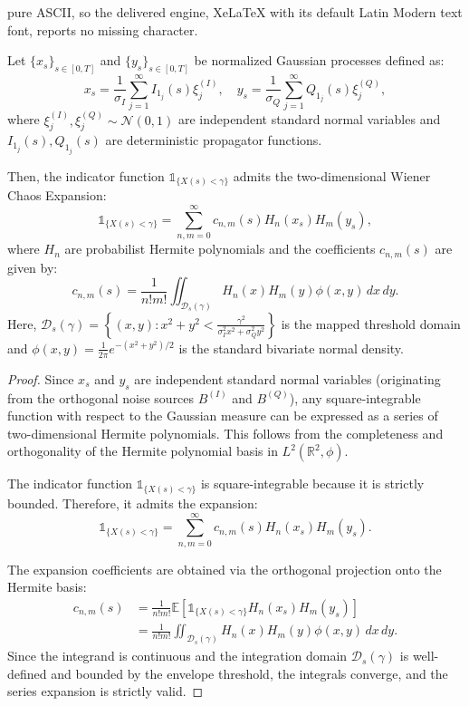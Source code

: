 \documentclass[10pt,a4paper]{amsart}
\begin{document}
pure ASCII, so the delivered engine, XeLaTeX with its default Latin Modern text font, reports no missing character.
\begin{proposition}\label{prop:ou_exact}
Let $\{x_s\}_{s \in [0,T]}$ and $\{y_s\}_{s \in [0,T]}$ be normalized Gaussian processes defined as:
\begin{equation}
    x_s = \frac{1}{\sigma_I} \sum_{j=1}^\infty I_{1_j}(s) \xi_j^{(I)}, \quad y_s = \frac{1}{\sigma_Q} \sum_{j=1}^\infty Q_{1_j}(s) \xi_j^{(Q)},
\end{equation}
where $\xi_j^{(I)}, \xi_j^{(Q)} \sim \mathcal{N}(0,1)$ are independent standard normal variables and $I_{1_j}(s), Q_{1_j}(s)$ are deterministic propagator functions.

Then, the indicator function $\mathds{1}_{\{X(s) < \gamma\}}$ admits the two-dimensional Wiener Chaos Expansion:
\begin{equation}
    \mathds{1}_{\{X(s) < \gamma\}} = \sum_{n,m=0}^\infty c_{n,m}(s) H_n(x_s) H_m(y_s),
\end{equation}
where $H_n$ are probabilist Hermite polynomials and the coefficients $c_{n,m}(s)$ are given by:
\begin{equation}
    c_{n,m}(s) = \frac{1}{n! m!} \iint_{\mathcal{D}_s(\gamma)} H_n(x) H_m(y) \phi(x,y) \, dx \, dy.
\end{equation}
Here, $\mathcal{D}_s(\gamma) = \left\{(x,y) : x^2 + y^2 < \frac{\gamma^2}{\sigma_I^2 x^2 + \sigma_Q^2 y^2}\right\}$ is the mapped threshold domain and $\phi(x,y) = \frac{1}{2\pi} e^{-(x^2+y^2)/2}$ is the standard bivariate normal density.
\end{proposition}

\begin{proof}
Since $x_s$ and $y_s$ are independent standard normal variables (originating from the orthogonal noise sources $B^{(I)}$ and $B^{(Q)}$), any square-integrable function with respect to the Gaussian measure can be expressed as a series of two-dimensional Hermite polynomials. This follows from the completeness and orthogonality of the Hermite polynomial basis in $L^2(\mathbb{R}^2, \phi)$.

The indicator function $\mathds{1}_{\{X(s) < \gamma\}}$ is square-integrable because it is strictly bounded. Therefore, it admits the expansion:
\begin{equation}
    \mathds{1}_{\{X(s) < \gamma\}} = \sum_{n,m=0}^\infty c_{n,m}(s) H_n(x_s) H_m(y_s).
\end{equation}

The expansion coefficients are obtained via the orthogonal projection onto the Hermite basis:
\begin{align}
  c_{n,m}(s) &= \frac{1}{n! m!} \mathbb{E}\left[\mathds{1}_{\{X(s) < \gamma\}} H_n(x_s) H_m(y_s)\right] \nonumber\\
  &= \frac{1}{n! m!} \iint_{\mathcal{D}_s(\gamma)} H_n(x) H_m(y) \phi(x,y) \, dx \, dy.
\end{align}
Since the integrand is continuous and the integration domain $\mathcal{D}_s(\gamma)$ is well-defined and bounded by the envelope threshold, the integrals converge, and the series expansion is strictly valid.
\end{proof}
\end{document}
